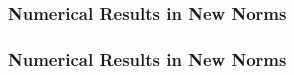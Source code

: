 
\begin{frame}
    \frametitle{Numerical Results in New Norms}

    \vspace*{\fill}
    \begin{multicols}{2}

        \begin{center}
            \begin{minipage}{0.4\textwidth}
                \begin{figure}[!ht]
                    
                \end{figure}
            \end{minipage}
        \end{center}

        \vfill\null
        \columnbreak

        \begin{center}
            \begin{minipage}{0.4\textwidth}
                \begin{figure}[!ht]
                    
                \end{figure}
            \end{minipage}
        \end{center}

    \end{multicols}
    \vspace*{\fill}
    
\end{frame}

\begin{frame}
    \frametitle{Numerical Results in New Norms}

    \vspace*{\fill}
    \begin{multicols}{2}

        \begin{center}
            \begin{minipage}{0.4\textwidth}
                \begin{figure}[!ht]
                    
                \end{figure}
            \end{minipage}
        \end{center}

        \vfill\null
        \columnbreak

        \begin{center}
            \begin{minipage}{0.4\textwidth}
                \begin{figure}[!ht]
                    
                \end{figure}
            \end{minipage}
        \end{center}

    \end{multicols}
    \vspace*{\fill}
    
\end{frame}